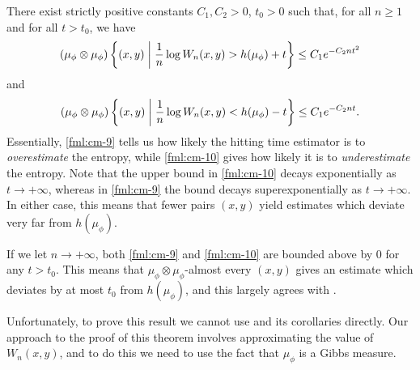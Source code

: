 \begin{theorem} \label{thm:cm-4-3}
	There exist strictly positive constants $C_1, C_2 > 0$, $t_0 > 0$ such that, for all $n \geq 1$ and for all $t > t_0$, we have
	\begin{equation}
		(\mu_\phi \otimes \mu_\phi)\left\{(x, y) \mathrel{}\middle|\mathrel{} \frac{1}{n}\log{W_n(x, y)} > h(\mu_\phi) + t\right\} \leq C_1 e^{-C_2 nt^2} \label{fml:cm-9}
	\end{equation}
	and
	\begin{equation}
		(\mu_\phi \otimes \mu_\phi)\left\{(x, y) \mathrel{}\middle|\mathrel{} \frac{1}{n}\log{W_n(x, y)} < h(\mu_\phi) - t\right\} \leq C_1 e^{-C_2 nt}. \label{fml:cm-10}
	\end{equation}	
	Essentially, \eqref{fml:cm-9} tells us how likely the hitting time estimator is to \emph{overestimate} the entropy, while \eqref{fml:cm-10} gives how likely it is to \emph{underestimate} the entropy. Note that the upper bound in \eqref{fml:cm-10} decays exponentially as $t \to +\infty$, whereas in \eqref{fml:cm-9} the bound decays superexponentially as $t \to +\infty$. In either case, this means that fewer pairs $(x, y)$ yield estimates which deviate very far from $h(\mu_\phi)$.
	
	If we let $n \to +\infty$, both \eqref{fml:cm-9} and \eqref{fml:cm-10} are bounded above by $0$ for any $t > t_0$. This means that $\mu_\phi \otimes \mu_\phi$-almost every $(x, y)$ gives an estimate which deviates by at most $t_0$ from $h(\mu_\phi)$, and this largely agrees with .
	
	Unfortunately, to prove this result we cannot use  and its corollaries directly. Our approach to the proof of this theorem involves approximating the value of $W_n(x, y)$, and to do this we need to use the fact that $\mu_\phi$ is a Gibbs measure.
	

\end{theorem}
